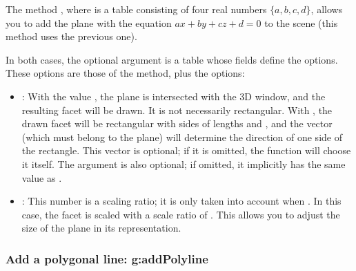The method , where  is a table consisting of four real numbers $\{a,b,c,d\}$, allows you to add the plane with the equation $ax+by+cz+d=0$ to the scene (this method uses the previous one).

In both cases, the optional argument  is a table whose fields define the options. These options are those of the  method, plus the options:

\begin{itemize}
    \item {}: With the value \nil, the plane is intersected with the 3D window, and the resulting facet will be drawn. It is not necessarily rectangular. With , the drawn facet will be rectangular with sides of lengths  and , and the vector  (which must belong to the plane) will determine the direction of one side of the rectangle. This vector  is optional; if it is omitted, the function will choose it itself. The argument  is also optional; if omitted, it implicitly has the same value as .
    
    \item {}: This number is a scaling ratio; it is only taken into account when . In this case, the facet is scaled with a scale ratio of . This allows you to adjust the size of the plane in its representation.
\end{itemize}

\subsubsection{Add a polygonal line: g:addPolyline}

